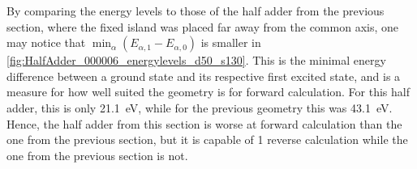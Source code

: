 \documentclass[11pt,a4paper,english]{article}
\begin{document}
By comparing the energy levels to those of the half adder from the previous section, where the fixed island was placed far away from the common axis, one may notice that $\min_\alpha(E_{\alpha,1}-E_{\alpha,0})$ is smaller in \cref{fig:HalfAdder_000006_energylevels_d50_s130}. This is the minimal energy difference between a ground state and its respective first excited state, and is a measure for how well suited the geometry is for forward calculation. For this half adder, this is only \SI{21.1}{\electronvolt}, while for the previous geometry this was \SI{43.1}{\electronvolt}. Hence, the half adder from this section is worse at forward calculation than the one from the previous section, but it is capable of 1 reverse calculation while the one from the previous section is not. \par %
\end{document}
